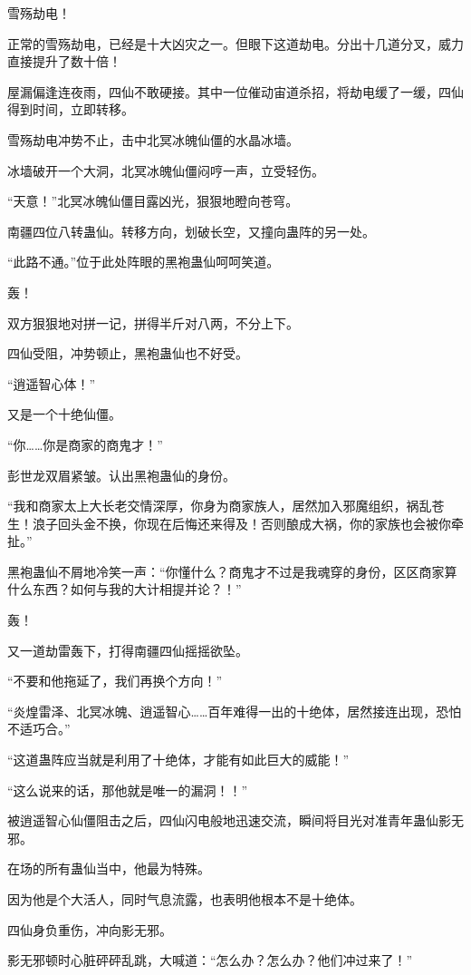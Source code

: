 \begin{this_body}
雪殇劫电！

正常的雪殇劫电，已经是十大凶灾之一。但眼下这道劫电。分出十几道分叉，威力直接提升了数十倍！

屋漏偏逢连夜雨，四仙不敢硬接。其中一位催动宙道杀招，将劫电缓了一缓，四仙得到时间，立即转移。

雪殇劫电冲势不止，击中北冥冰魄仙僵的水晶冰墙。

冰墙破开一个大洞，北冥冰魄仙僵闷哼一声，立受轻伤。

“天意！”北冥冰魄仙僵目露凶光，狠狠地瞪向苍穹。

南疆四位八转蛊仙。转移方向，划破长空，又撞向蛊阵的另一处。

“此路不通。”位于此处阵眼的黑袍蛊仙呵呵笑道。

轰！

双方狠狠地对拼一记，拼得半斤对八两，不分上下。

四仙受阻，冲势顿止，黑袍蛊仙也不好受。

“逍遥智心体！”

又是一个十绝仙僵。

“你……你是商家的商鬼才！”

彭世龙双眉紧皱。认出黑袍蛊仙的身份。

“我和商家太上大长老交情深厚，你身为商家族人，居然加入邪魔组织，祸乱苍生！浪子回头金不换，你现在后悔还来得及！否则酿成大祸，你的家族也会被你牵扯。”

黑袍蛊仙不屑地冷笑一声：“你懂什么？商鬼才不过是我魂穿的身份，区区商家算什么东西？如何与我的大计相提并论？！”

轰！

又一道劫雷轰下，打得南疆四仙摇摇欲坠。

“不要和他拖延了，我们再换个方向！”

“炎煌雷泽、北冥冰魄、逍遥智心……百年难得一出的十绝体，居然接连出现，恐怕不适巧合。”

“这道蛊阵应当就是利用了十绝体，才能有如此巨大的威能！”

“这么说来的话，那他就是唯一的漏洞！！”

被逍遥智心仙僵阻击之后，四仙闪电般地迅速交流，瞬间将目光对准青年蛊仙影无邪。

在场的所有蛊仙当中，他最为特殊。

因为他是个大活人，同时气息流露，也表明他根本不是十绝体。

四仙身负重伤，冲向影无邪。

影无邪顿时心脏砰砰乱跳，大喊道：“怎么办？怎么办？他们冲过来了！”


\end{this_body}
